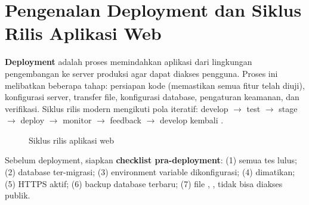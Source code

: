﻿\section{Pengenalan Deployment dan Siklus Rilis Aplikasi Web}

\textbf{Deployment} adalah proses memindahkan aplikasi dari lingkungan pengembangan ke server produksi agar dapat diakses pengguna. Proses ini melibatkan beberapa tahap: persiapan kode (memastikan semua fitur telah diuji), konfigurasi server, transfer file, konfigurasi database, pengaturan keamanan, dan verifikasi. Siklus rilis modern mengikuti pola iteratif: develop $\to$ test $\to$ stage $\to$ deploy $\to$ monitor $\to$ feedback $\to$ develop kembali \cite{mdnDeploy}.

\begin{figure}[H]
\centering
{}
\caption{Siklus rilis aplikasi web}
\end{figure}

Sebelum deployment, siapkan \textbf{checklist pra-deployment}: (1) semua tes lulus; (2) database ter-migrasi; (3) environment variable dikonfigurasi; (4)  dimatikan; (5) HTTPS aktif; (6) backup database terbaru; (7) file , ,  tidak bisa diakses publik.

